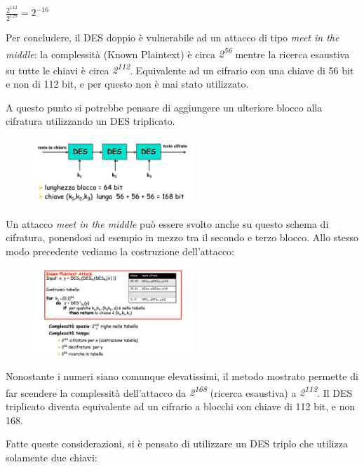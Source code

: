 \begin{center}
    $\frac{2^{112}}{2^{128}} = 2^{-16}$
\end{center}

Per concludere, il DES doppio è vulnerabile ad un attacco di tipo \textit{meet in the middle}: la complessità (Known Plaintext) è circa \textit{2\textsuperscript{56}} mentre la ricerca esaustiva su tutte le chiavi è circa \textit{2\textsuperscript{112}}. Equivalente ad un cifrario con una chiave di 56 bit e non di 112 bit, e per questo non è mai stato utilizzato.

\vspace{5mm}


A questo punto si potrebbe pensare di aggiungere un ulteriore blocco alla cifratura utilizzando un DES triplicato.

\begin{figure}[htb!]
    \centering
    \includegraphics[width=6cm]{./Images/cap1/1.14.png}
\end{figure} 

Un attacco \textit{meet in the middle} può essere svolto anche su questo schema di cifratura, ponendosi ad esempio in mezzo tra il secondo e terzo blocco. Allo stesso modo precedente vediamo la costruzione dell'attacco:

\begin{figure}[htb!]
    \centering
    \includegraphics[width=6cm]{./Images/cap1/1.15.png}
\end{figure} 

Nonostante i numeri siano comunque elevatissimi, il metodo mostrato permette di far scendere la complessità dell'attacco da \textit{2\textsuperscript{168}} (ricerca esaustiva) a \textit{2\textsuperscript{112}}. Il DES triplicato diventa equivalente ad un cifrario a blocchi con chiave di 112 bit, e non 168.

Fatte queste considerazioni, si è pensato di utilizzare un DES triplo che utilizza solamente due chiavi:


